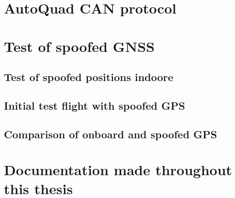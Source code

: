 \section{AutoQuad CAN protocol}

\newpage


\section{Test of spoofed GNSS}


\subsection{Test of spoofed positions indoore}
\label{sec:test_of_spoofed_positions_indoore}



\subsection{Initial test flight with spoofed GPS}
\label{sec:test_of_spoofed_positions_outdoore}


\subsection{Comparison of onboard and spoofed GPS}
\label{sec:test_of_spoofed_positions_outdoore}


\section{Documentation made throughout this thesis}

